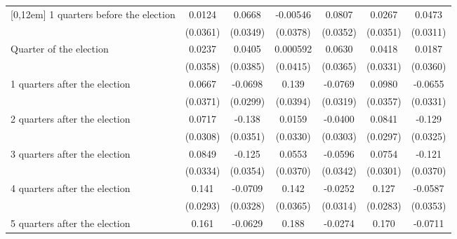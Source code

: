 \begin{table}[!ht]
\begin{tabular}{l*{6}{c}}
[0,12em]
 1 quarters before the election&      0.0124         &      0.0668         &    -0.00546         &      0.0807\sym{*}  &      0.0267         &      0.0473         \\
                    &    (0.0361)         &    (0.0349)         &    (0.0378)         &    (0.0352)         &    (0.0351)         &    (0.0311)         \\
[0,12em]
Quarter of the election&      0.0237         &      0.0405         &    0.000592         &      0.0630         &      0.0418         &      0.0187         \\
                    &    (0.0358)         &    (0.0385)         &    (0.0415)         &    (0.0365)         &    (0.0331)         &    (0.0360)         \\
[0,12em]
 1 quarters after the election&      0.0667         &     -0.0698\sym{*}  &       0.139\sym{***}&     -0.0769\sym{*}  &      0.0980\sym{**} &     -0.0655\sym{*}  \\
                    &    (0.0371)         &    (0.0299)         &    (0.0394)         &    (0.0319)         &    (0.0357)         &    (0.0331)         \\
[0,12em]
 2 quarters after the election&      0.0717\sym{*}  &      -0.138\sym{***}&      0.0159         &     -0.0400         &      0.0841\sym{**} &      -0.129\sym{***}\\
                    &    (0.0308)         &    (0.0351)         &    (0.0330)         &    (0.0303)         &    (0.0297)         &    (0.0325)         \\
[0,12em]
 3 quarters after the election&      0.0849\sym{*}  &      -0.125\sym{***}&      0.0553         &     -0.0596         &      0.0754\sym{*}  &      -0.121\sym{**} \\
                    &    (0.0334)         &    (0.0354)         &    (0.0370)         &    (0.0342)         &    (0.0301)         &    (0.0370)         \\
[0,12em]
 4 quarters after the election&       0.141\sym{***}&     -0.0709\sym{*}  &       0.142\sym{***}&     -0.0252         &       0.127\sym{***}&     -0.0587         \\
                    &    (0.0293)         &    (0.0328)         &    (0.0365)         &    (0.0314)         &    (0.0283)         &    (0.0353)         \\
[0,12em]
 5 quarters after the election&       0.161\sym{***}&     -0.0629         &       0.188\sym{***}&     -0.0274         &       0.170\sym{***}&     -0.0711\sym{*}  \\

\end{tabular}
\end{table}
